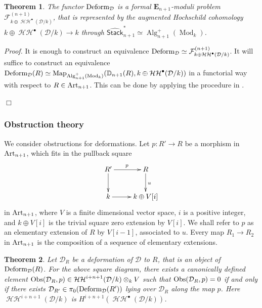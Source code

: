 \documentclass[leqno,12pt]{amsart}
\theoremstyle{plain}
\newtheorem{Theorem}{Theorem}[section]
\theoremstyle{definition}
\newcommand{\DD}{\mathbb{D}}
\newcommand{\HH}{\operatorname{\mathcal{HH}}}
\newcommand{\DDD}{\mathcal{D}}
\newcommand{\Mod}{\operatorname{Mod}}
\newcommand{\Map}{\operatorname{Map}}
\newcommand{\Alg}{\operatorname{Alg}}
\newcommand{\Proof}{{\sl Proof.}\quad}
\newcommand{\QED}{{\unskip\nobreak\hfil\penalty50\quad\null\nobreak\hfil
{$\Box$}\parfillskip0pt\finalhyphendemerits0\par\medskip}}
\begin{document}
\begin{Theorem}
\label{FMPmain}
The functor
$\textup{Deform}_{\DDD}$ is a formal $\mathbf{E}_{n+1}$-moduli problem $\mathcal{F}_{k\oplus \HH^\bullet(\DDD/k)}^{(n+1)}$, that is represented by
the augmented Hochschild cohomology $k\oplus\HH^\bullet(\DDD/k)\to k$ through $\widehat{\mathsf{Stack}}_{n+1}^\ast \simeq \Alg_{n+1}^+(\Mod_k)$.
\end{Theorem}


\Proof
It is enough to construct an equivalence
$\textup{Deform}_{\DDD}\simeq \mathcal{F}_{k\oplus \HH^\bullet(\DDD/k)}^{(n+1)}$.
It will suffice to construct an equivalence $\textup{Deform}_{\DDD}(R)\simeq \Map_{\Alg_{n+1}^+(\Mod_k)}(\DD_{n+1}(R),k\oplus \HH^\bullet(\DDD/k))$
in a functorial way with respect to $R\in \textup{Art}_{n+1}$.
This can be done by applying the procedure in \cite[X, Construction 5.3.18]{DAG}.
\QED

\subsubsection{Obstruction theory}
\label{obssec}
We consider obstructions for deformations.
Let $p:R'\to R$ be a morphism in $\textup{Art}_{n+1}$, which fits in the pullback square
\[
\xymatrix{
R' \ar[r]^p \ar[d] & R \ar[d]^u \\
k \ar[r] & k\oplus V[i] 
}
\]
in $\textup{Art}_{n+1}$, where $V$ is a finite dimensional vector space, $i$ is a positive integer,
and $k\oplus V[i]$ is the trivial square zero extension by $V[i]$.
We shall refer to $p$ as an elementary extension of $R$ by $V[i-1]$, associated to $u$.
Every map $R_1\to R_2$ in $\textup{Art}_{n+1}$ is the composition of a sequence of elementary extensions.

\begin{Theorem}
\label{obstructionmain}
Let $\DDD_R$ be a deformation of $\DDD$ to $R$, that is an object of $\textup{Deform}_{\DDD}(R)$. 
For the above square diagram, there exists a canonically defined element $\textup{Obs}(\DDD_R,p)\in \HH^{i+n+1}(\DDD/k)\otimes_kV$ 
such that $\textup{Obs}(\DDD_R,p)=0$ if and only if there exists $\DDD_{R'}\in \pi_0(\textup{Deform}_{\DDD}(R'))$ lying over $\DDD_R$ along  the map $p$.
Here $\HH^{i+n+1}(\DDD/k)$ is $H^{i+n+1}(\HH^\bullet(\DDD/k))$.
\end{Theorem}
\end{document}
